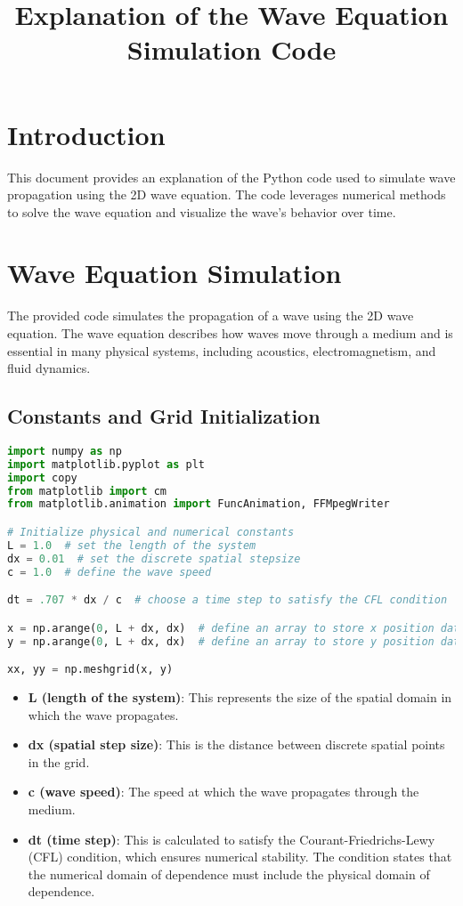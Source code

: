 \documentclass{article}
\title{Explanation of the Wave Equation Simulation Code}
\author{}
\date{}
\begin{document}
\maketitle

\section{Introduction}

This document provides an explanation of the Python code used to simulate wave propagation using the 2D wave equation. The code leverages numerical methods to solve the wave equation and visualize the wave's behavior over time.

\section{Wave Equation Simulation}

The provided code simulates the propagation of a wave using the 2D wave equation. The wave equation describes how waves move through a medium and is essential in many physical systems, including acoustics, electromagnetism, and fluid dynamics.

\subsection{Constants and Grid Initialization}

\begin{lstlisting}[language=Python]
import numpy as np
import matplotlib.pyplot as plt
import copy
from matplotlib import cm
from matplotlib.animation import FuncAnimation, FFMpegWriter

# Initialize physical and numerical constants
L = 1.0  # set the length of the system
dx = 0.01  # set the discrete spatial stepsize
c = 1.0  # define the wave speed

dt = .707 * dx / c  # choose a time step to satisfy the CFL condition

x = np.arange(0, L + dx, dx)  # define an array to store x position data
y = np.arange(0, L + dx, dx)  # define an array to store y position data

xx, yy = np.meshgrid(x, y)
\end{lstlisting}

\begin{itemize}
    \item \textbf{L (length of the system)}: This represents the size of the spatial domain in which the wave propagates.
    \item \textbf{dx (spatial step size)}: This is the distance between discrete spatial points in the grid.
    \item \textbf{c (wave speed)}: The speed at which the wave propagates through the medium.
    \item \textbf{dt (time step)}: This is calculated to satisfy the Courant-Friedrichs-Lewy (CFL) condition, which ensures numerical stability. The condition states that the numerical domain of dependence must include the physical domain of dependence.
\end{itemize}
\end{document}
